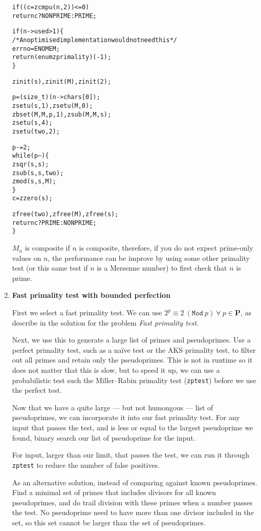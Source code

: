 \begin{enumerate}[label=\textbf{\arabic*}.]
\begin{alltt}
    if ((c = zcmpu(n, 2)) <= 0)
        return c ? NONPRIME : PRIME;

    if (n->used > 1) \{
        \textcolor{c}{/* \textrm{An optimised implementation would not need this} */}
        errno = ENOMEM;
        return (enum zprimality)(-1);
    \}

    zinit(s), zinit(M), zinit(2);

    p = (size_t)(n->chars[0]);
    zsetu(s, 1), zsetu(M, 0);
    zbset(M, M, p, 1), zsub(M, M, s);
    zsetu(s, 4);
    zsetu(two, 2);

    p -= 2;
    while (p--) \{
        zsqr(s, s);
        zsub(s, s, two);
        zmod(s, s, M);
    \}
    c = zzero(s);

    zfree(two), zfree(M), zfree(s);
    return c ? PRIME : NONPRIME;
\}
\end{alltt}

$M_n$ is composite if $n$ is composite, therefore,
if you do not expect prime-only values on $n$, the
performance can be improve by using some other
primality test (or this same test if $n$ is a
Mersenne number) to first check that $n$ is prime.



\item \textbf{Fast primality test with bounded perfection}

First we select a fast primality test. We can use
$2^p \equiv 2 ~(\texttt{Mod}~ p) ~\forall~ p \in \textbf{P}$,
as describe in the solution for the problem
\textit{Fast primality test}.

Next, we use this to generate a large list of primes and
pseudoprimes. Use a perfect primality test, such as a
naïve test or the AKS primality test, to filter out all
primes and retain only the pseudoprimes. This is not in
runtime so it does not matter that this is slow, but to
speed it up, we can use a probabilistic test such the
Miller–Rabin primality test (\texttt{zptest}) before we
use the perfect test.

Now that we have a quite large — but not humongous — list
of pseudoprimes, we can incorporate it into our fast
primality test. For any input that passes the test, and
is less or equal to the largest pseudoprime we found,
binary search our list of pseudoprime for the input.

For input, larger than our limit, that passes the test,
we can run it through \texttt{zptest} to reduce the
number of false positives.

As an alternative solution, instead of comparing against
known pseudoprimes. Find a minimal set of primes that
includes divisors for all known pseudoprimes, and do
trail division with these primes when a number passes
the test. No pseudoprime need to have more than one divisor
included in the set, so this set cannot be larger than
the set of pseudoprimes.




\end{enumerate}
